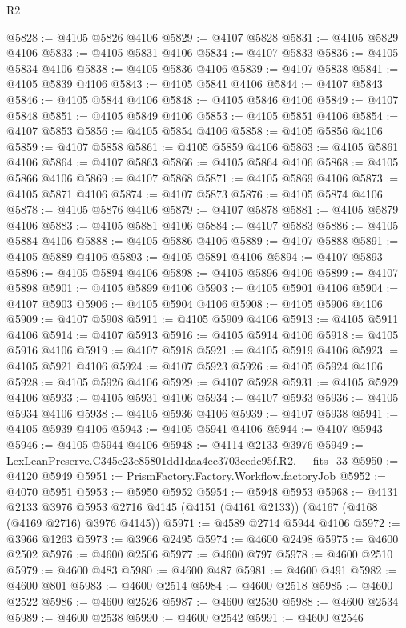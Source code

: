 \begin{lexlean}{R2}
\begin{coremodule}
@5828 := @4105 @5826 @4106
@5829 := @4107 @5828
@5831 := @4105 @5829 @4106
@5833 := @4105 @5831 @4106
@5834 := @4107 @5833
@5836 := @4105 @5834 @4106
@5838 := @4105 @5836 @4106
@5839 := @4107 @5838
@5841 := @4105 @5839 @4106
@5843 := @4105 @5841 @4106
@5844 := @4107 @5843
@5846 := @4105 @5844 @4106
@5848 := @4105 @5846 @4106
@5849 := @4107 @5848
@5851 := @4105 @5849 @4106
@5853 := @4105 @5851 @4106
@5854 := @4107 @5853
@5856 := @4105 @5854 @4106
@5858 := @4105 @5856 @4106
@5859 := @4107 @5858
@5861 := @4105 @5859 @4106
@5863 := @4105 @5861 @4106
@5864 := @4107 @5863
@5866 := @4105 @5864 @4106
@5868 := @4105 @5866 @4106
@5869 := @4107 @5868
@5871 := @4105 @5869 @4106
@5873 := @4105 @5871 @4106
@5874 := @4107 @5873
@5876 := @4105 @5874 @4106
@5878 := @4105 @5876 @4106
@5879 := @4107 @5878
@5881 := @4105 @5879 @4106
@5883 := @4105 @5881 @4106
@5884 := @4107 @5883
@5886 := @4105 @5884 @4106
@5888 := @4105 @5886 @4106
@5889 := @4107 @5888
@5891 := @4105 @5889 @4106
@5893 := @4105 @5891 @4106
@5894 := @4107 @5893
@5896 := @4105 @5894 @4106
@5898 := @4105 @5896 @4106
@5899 := @4107 @5898
@5901 := @4105 @5899 @4106
@5903 := @4105 @5901 @4106
@5904 := @4107 @5903
@5906 := @4105 @5904 @4106
@5908 := @4105 @5906 @4106
@5909 := @4107 @5908
@5911 := @4105 @5909 @4106
@5913 := @4105 @5911 @4106
@5914 := @4107 @5913
@5916 := @4105 @5914 @4106
@5918 := @4105 @5916 @4106
@5919 := @4107 @5918
@5921 := @4105 @5919 @4106
@5923 := @4105 @5921 @4106
@5924 := @4107 @5923
@5926 := @4105 @5924 @4106
@5928 := @4105 @5926 @4106
@5929 := @4107 @5928
@5931 := @4105 @5929 @4106
@5933 := @4105 @5931 @4106
@5934 := @4107 @5933
@5936 := @4105 @5934 @4106
@5938 := @4105 @5936 @4106
@5939 := @4107 @5938
@5941 := @4105 @5939 @4106
@5943 := @4105 @5941 @4106
@5944 := @4107 @5943
@5946 := @4105 @5944 @4106
@5948 := @4114 @2133 @3976
@5949 := LexLeanPreserve.C345e23e85801dd1daa4ec3703cedc95f.R2.__fits_33
@5950 := @4120 @5949
@5951 := PrismFactory.Factory.Workflow.factoryJob
@5952 := @4070 @5951
@5953 := @5950 @5952
@5954 := @5948 @5953
@5968 := @4131
    @2133
    @3976
    @5953
    @2716
    @4145
    (@4151 (@4161 @2133))
    (@4167 (@4168 (@4169 @2716) @3976 @4145))
@5971 := @4589 @2714 @5944 @4106
@5972 := @3966 @1263
@5973 := @3966 @2495
@5974 := @4600 @2498
@5975 := @4600 @2502
@5976 := @4600 @2506
@5977 := @4600 @797
@5978 := @4600 @2510
@5979 := @4600 @483
@5980 := @4600 @487
@5981 := @4600 @491
@5982 := @4600 @801
@5983 := @4600 @2514
@5984 := @4600 @2518
@5985 := @4600 @2522
@5986 := @4600 @2526
@5987 := @4600 @2530
@5988 := @4600 @2534
@5989 := @4600 @2538
@5990 := @4600 @2542
@5991 := @4600 @2546

\end{coremodule}
\end{lexlean}
